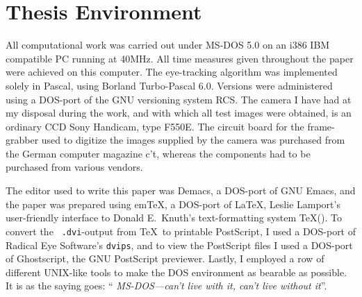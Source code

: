 
\section{Thesis Environment}
\label{intro:env}

All computational work was carried out under MS-DOS 5.0 on an i386 IBM
compatible PC running at 40MHz.  All time measures given throughout
the paper were achieved on this computer.  The eye-tracking algorithm
{\octopus} was implemented solely in Pascal, using Borland
Turbo-Pascal 6.0.  Versions were administered using a DOS-port of the
GNU versioning system RCS.  The camera I have had at my disposal
during the work, and with which all test images were obtained, is an
ordinary CCD Sony Handicam, type F550E.  The circuit board for the
frame-grabber used to digitize the images supplied by the camera was
purchased from the German computer magazine {\sf c't\/}, whereas the
components had to be purchased from various vendors.

The editor used to write this paper was Demacs, a DOS-port of GNU
Emacs, and the paper was prepared using em\TeX, a DOS-port of \LaTeX,
Leslie Lamport's user-friendly interface to Donald E.\ Knuth's
text-formatting system \TeX (\cite{lamport}).  To convert the {\tt
  .dvi}-output from \TeX\ to printable PostScript, I used a DOS-port
of Radical Eye Software's {\tt dvips}, and to view the PostScript
files I used a DOS-port of Ghostscript, the GNU PostScript previewer.
Lastly, I employed a row of different UNIX-like tools to make the DOS
environment as bearable as possible.  It is as the saying goes: ``{\em
  MS-DOS---can't live with it, can't live without it\/}''.
